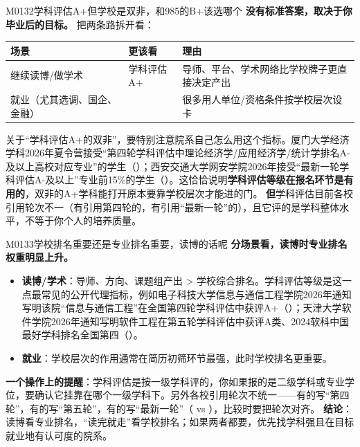 \begin{qa}{M0132}{学科评估A+但学校是双非，和985的B+该选哪个}
\textbf{没有标准答案，取决于你毕业后的目标。} 把两条路拆开看：
\par\vspace{2pt}\nobreak\begin{center}\footnotesize
\begin{tabularx}{\textwidth}{>{\raggedright\arraybackslash}X>{\raggedright\arraybackslash}X>{\raggedright\arraybackslash}X}
\toprule
\textbf{场景} & \textbf{更该看} & \textbf{理由} \\ \midrule
继续读博/做学术 & 学科评估A+ & 导师、平台、学术网络比学校牌子更直接决定产出 \\
就业（尤其选调、国企、金融） & 985 & 很多用人单位/资格条件按学校层次设卡 \\
\bottomrule
\end{tabularx}
\end{center}\vspace{2pt}\par

关于“学科评估A+的双非”，要特别注意院系自己怎么用这个指标。厦门大学经济学科2026年夏令营接受“第四轮学科评估中理论经济学/应用经济学/统计学排名A-及以上高校对应专业”的学生（）；西安交通大学网安学院2026年接受“最新一轮学科评估A-及以上”专业前15\%的学生（）。这恰恰说明\textbf{学科评估等级在报名环节是有用的}，双非的A+学科能打开原本要靠学校层次才能进的门。
\textbf{但}学科评估目前各校引用轮次不一（有引用第四轮的，有引用“最新一轮”的），且它评的是学科整体水平，不等于你个人的培养质量。
\end{qa}

\begin{qa}{M0133}{学校排名重要还是专业排名重要，读博的话呢}
\textbf{分场景看，读博时专业排名权重明显上升。}
\begin{itemize}
  \item \textbf{读博/学术}：导师、方向、课题组产出 \textgreater{} 学校综合排名。学科评估等级是这一点最常见的公开代理指标，例如电子科技大学信息与通信工程学院2026年通知写明该院“信息与通信工程”在全国第四轮学科评估中获评A+（）；天津大学软件学院2026年通知写明软件工程在第五轮学科评估中获评A类、2024软科中国最好学科排名全国第四（）。
  \item \textbf{就业}：学校层次的作用通常在简历初筛环节最强，此时学校排名更重要。
\end{itemize}
\textbf{一个操作上的提醒}：学科评估是按一级学科评的，你如果报的是二级学科或专业学位，要确认它挂靠在哪个一级学科下。另外各校引用轮次不统一——有的写“第四轮”，有的写“第五轮”，有的写“最新一轮”（ vs ），比较时要把轮次对齐。
\textbf{结论}：读博看专业排名，“读完就走”看学校排名；如果两者都要，优先找学科强且在目标就业地有认可度的院系。
\end{qa}

